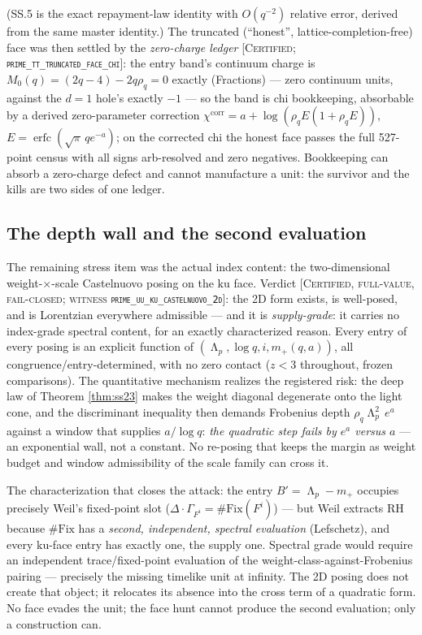 \documentclass[11pt,reqno]{amsart}
\theoremstyle{plain}
\theoremstyle{definition}
\theoremstyle{remark}
\newcommand{\ku}{\mathrm{ku}}
\newcommand{\grade}[1]{\textup{[\textsc{#1}]}}
\DeclareMathOperator{\Lam}{\Lambda}
\DeclareMathOperator{\erfc}{erfc}
\begin{document}
(SS.5 is the exact repayment-law identity with $O(q^{-2})$ relative error, derived from the
same master identity.) The truncated (``honest'', lattice-completion-free) face was then
settled by the \emph{zero-charge ledger} \grade{Certified;
\texttt{prime\_\allowbreak tt\_\allowbreak truncated\_\allowbreak face\_\allowbreak chi}}: the entry band's continuum charge is
$M_0(q) = (2q - 4) - 2q\rho_q = 0$ exactly (Fractions) --- zero continuum units, against the
$d = 1$ hole's exactly $-1$ --- so the band is chi bookkeeping, absorbable by a derived
zero-parameter correction $\chi^{\mathrm{corr}} = a + \log(\rho_q E(1 + \rho_q E))$,
$E = \erfc(\sqrt{\pi}\, q e^{-a})$; on the corrected chi the honest face passes the full
527-point census with all signs arb-resolved and zero negatives. Bookkeeping can absorb a
zero-charge defect and cannot manufacture a unit: the survivor and the kills are two sides of
one ledger.

\subsection{The depth wall and the second evaluation}\label{subsec:uu}

The remaining stress item was the actual index content: the two-dimensional
weight-$\times$-scale Castelnuovo posing on the $\ku$ face. Verdict
\grade{Certified, full-value, fail-closed; witness \texttt{prime\_\allowbreak uu\_\allowbreak ku\_\allowbreak castelnuovo\_\allowbreak 2d}}:
the 2D form exists, is well-posed, and is Lorentzian everywhere admissible --- and it is
\emph{supply-grade}: it carries no index-grade spectral content, for an exactly characterized
reason. Every entry of every posing is an explicit function of
$(\Lam_p, \log q, i, m_+(q,a))$, all congruence/entry-determined, with no zero contact
($z < 3$ throughout, frozen comparisons). The quantitative mechanism realizes the registered
risk: the deep law of Theorem \ref{thm:ss23} makes the weight diagonal degenerate onto the
light cone, and the discriminant inequality then demands Frobenius depth
$\rho_q \Lam_p^2\, e^a$ against a window that supplies $a/\log q$: \emph{the quadratic step
fails by $e^a$ versus $a$} --- an exponential wall, not a constant. No re-posing that keeps
the margin as weight budget and window admissibility of the scale family can cross it.

The characterization that closes the attack: the entry $B' = \Lam_p - m_+$ occupies
precisely Weil's fixed-point slot ($\Delta \cdot \Gamma_{F^i} = \#\mathrm{Fix}(F^i)$) ---
but Weil extracts RH because $\#\mathrm{Fix}$ has a \emph{second, independent, spectral
evaluation} (Lefschetz), and every $\ku$-face entry has exactly one, the supply one.
Spectral grade would require an independent trace/fixed-point evaluation of the
weight-class-against-Frobenius pairing --- precisely the missing timelike unit at infinity.
The 2D posing does not create that object; it relocates its absence into the cross term of a
quadratic form. No face evades the unit; the face hunt cannot produce the second evaluation;
only a construction can.
\end{document}
